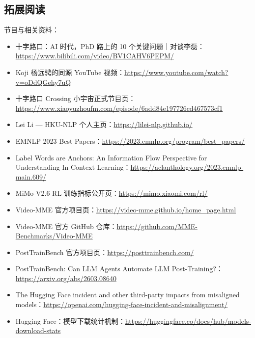 \documentclass[UTF8,a4paper,11pt,fontset=fandol]{ctexart}
\begin{document}
\subsection{拓展阅读}
节目与相关资料：
\begin{itemize}
\item 十字路口：AI 时代，PhD 路上的 10 个关键问题｜对谈李磊：\url{https://www.bilibili.com/video/BV1CAHV6PEPM/}
\item Koji 杨远骋的同源 YouTube 视频：\url{https://www.youtube.com/watch?v=oDdQGehy7uQ}
\item 十字路口 Crossing 小宇宙正式节目页：\url{https://www.xiaoyuzhoufm.com/episode/6add84e197726cd467573cf1}
\item Lei Li — HKU-NLP 个人主页：\url{https://lilei-nlp.github.io/}
\item EMNLP 2023 Best Papers：\url{https://2023.emnlp.org/program/best_papers/}
\item Label Words are Anchors: An Information Flow Perspective for Understanding In-Context Learning：\url{https://aclanthology.org/2023.emnlp-main.609/}
\item MiMo-V2.6 RL 训练指标公开页：\url{https://mimo.xiaomi.com/rl/}
\item Video-MME 官方项目页：\url{https://video-mme.github.io/home_page.html}
\item Video-MME 官方 GitHub 仓库：\url{https://github.com/MME-Benchmarks/Video-MME}
\item PostTrainBench 官方项目页：\url{https://posttrainbench.com/}
\item PostTrainBench: Can LLM Agents Automate LLM Post-Training?：\url{https://arxiv.org/abs/2603.08640}
\item The Hugging Face incident and other third-party impacts from misaligned models：\url{https://openai.com/hugging-face-incident-and-misalignment/}
\item Hugging Face：模型下载统计机制：\url{https://huggingface.co/docs/hub/models-download-stats}
\end{itemize}
\end{document}
